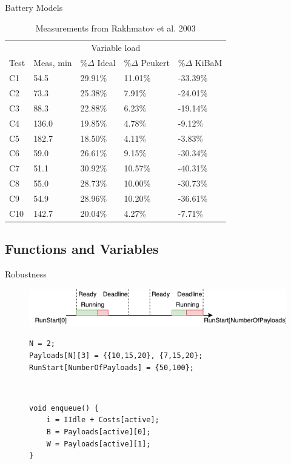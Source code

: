 \begin{frame}[fragile]{Battery Models}{\insertsubsection}
\begin{table}[]
	\centering
	\begin{tabular}{lllll}
		\multicolumn{5}{c}{Variable load} \\
		\rowcolor[HTML]{EFEFEF} 
		Test & Meas, min & \%$\Delta$ Ideal & \%$\Delta$ Peukert & \%$\Delta$ KiBaM \\
		C1 & 54.5 & 29.91\% & 11.01\% & -33.39\% \\
		\rowcolor[HTML]{EFEFEF} 
		C2 & 73.3 & 25.38\% & 7.91\% & -24.01\% \\
		C3 & 88.3 & 22.88\% & 6.23\% & -19.14\% \\
		\rowcolor[HTML]{EFEFEF} 
		C4 & 136.0 & 19.85\% & 4.78\% & -9.12\% \\
		C5 & 182.7 & 18.50\% & 4.11\% & -3.83\% \\
		\rowcolor[HTML]{EFEFEF} 
		C6 & 59.0 & 26.61\% & 9.15\% & -30.34\% \\
		C7 & 51.1 & 30.92\% & 10.57\% & -40.31\% \\
		\rowcolor[HTML]{EFEFEF} 
		C8 & 55.0 & 28.73\% & 10.00\% & -30.73\% \\
		C9 & 54.9 & 28.96\% & 10.20\% & -36.61\% \\
		\rowcolor[HTML]{EFEFEF} 
		C10 & 142.7 & 20.04\% & 4.27\% & -7.71\%
	\end{tabular}
	\caption{Measurements from Rakhmatov et al. 2003}
\end{table}
\end{frame}

\subsection{Functions and Variables}
\begin{frame}[fragile]{Robustness}{\insertsubsection}
	\centering
	\begin{figure}[h]
		\includegraphics[width=1\textwidth]{graphics/payload_execution}
	\end{figure}
	\begin{figure}[h]
		\begin{minipage}{.7\textwidth}
		\begin{lstlisting}
N = 2;
Payloads[N][3] = {{10,15,20}, {7,15,20};
RunStart[NumberOfPayloads] = {50,100};
		\end{lstlisting}
		\end{minipage}\\
		\begin{minipage}{.7\textwidth}
			\begin{lstlisting}
void enqueue() {
    i = IIdle + Costs[active];
    B = Payloads[active][0];
    W = Payloads[active][1];
}
			\end{lstlisting}
		\end{minipage}
	\end{figure}
\end{frame}


